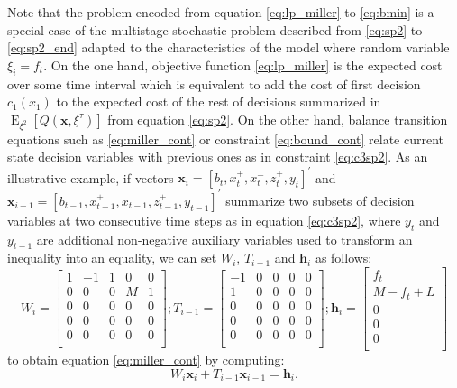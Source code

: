Note that the problem encoded from equation \eqref{eq:lp_miller} to \eqref{eq:bmin} is a special case of the multistage stochastic problem described from \eqref{eq:sp2} to \eqref{eq:sp2_end} adapted to the characteristics of the \cite{miller1966model} model where random variable $\xi_i = f_t$. On the one hand, objective function \eqref{eq:lp_miller} is the expected cost over some time interval which is equivalent to add the cost of first decision $c_1(x_1)$ to the expected cost of the rest of decisions summarized in $\operatorname{E}_{\xi^2} \left[ Q(\boldsymbol{x},\xi^{\tau}) \right]$ from equation \eqref{eq:sp2}. On the other hand, balance transition equations such as \eqref{eq:miller_cont} or constraint \eqref{eq:bound_cont} relate current state decision variables with previous ones as in constraint \eqref{eq:c3sp2}. As an illustrative example, if vectors $\boldsymbol{x}_i = \left[b_t, x_t^+, x_t^-, z_t^+, y_t\right]^\prime$ and $\boldsymbol{x}_{i-1} = \left[b_{t-1}, x_{t-1}^+, x_{t-1}^-, z_{t-1}^+, y_{t-1}\right]^\prime$ summarize two subsets of decision variables at two consecutive time steps as in equation \eqref{eq:c3sp2}, where $y_t$ and $y_{t-1}$ are additional non-negative auxiliary variables used to transform an inequality into an equality, we can set $W_i$, $T_{i-1}$ and $\boldsymbol{h}_i$ as follows:
\begin{equation}
W_i = \left[ \begin{array}{rrrrr}
1 & -1 &  1 & 0 & 0\\ 
0 & 0 & 0 & M & 1 \\
0 & 0 & 0 & 0 & 0 \\
0 & 0 & 0 & 0 & 0 \\
0 & 0 & 0 & 0 & 0 \\
\end{array} \right];
T_{i-1} = \left[ \begin{array}{rrrrr}
-1 & 0 & 0 & 0 & 0 \\ 
1 & 0 & 0 & 0 & 0  \\ 
0 & 0 & 0 & 0 & 0  \\ 
0 & 0 & 0 & 0 & 0  \\ 
0 & 0 & 0 & 0 & 0  \\ 
\end{array} \right];
\boldsymbol{h}_i = \left[ \begin{array}{c}
f_t \\
M -f_t + L\\
0 \\
0 \\
0 \\
\end{array} \right]
\end{equation}
to obtain equation \eqref{eq:miller_cont} by computing:
\begin{equation}
W_i \boldsymbol{x}_i + T_{i-1} \boldsymbol{x}_{i-1} = \boldsymbol{h}_i.
\end{equation}

